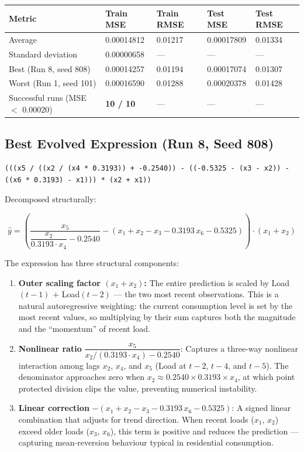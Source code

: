 \documentclass[12pt,a4paper]{article}
\begin{document}
\begin{center}
\begin{tabular}{lllll}
\toprule
\textbf{Metric} & \textbf{Train MSE} & \textbf{Train RMSE} & \textbf{Test MSE} & \textbf{Test RMSE} \\
\midrule
Average                           & 0.00014812 & 0.01217 & 0.00017809 & 0.01334 \\
Standard deviation                & 0.00000658 & ---     & ---        & ---     \\
Best (Run 8, seed 808)            & 0.00014257 & 0.01194 & 0.00017074 & 0.01307 \\
Worst (Run 1, seed 101)           & 0.00016590 & 0.01288 & 0.00020378 & 0.01428 \\
Successful runs (MSE $<$ 0.00020) & \textbf{10 / 10} & --- & --- & --- \\
\bottomrule
\end{tabular}
\end{center}

\subsection{Best Evolved Expression (Run 8, Seed 808)}

\begin{lstlisting}
(((x5 / ((x2 / (x4 * 0.3193)) + -0.2540)) - ((-0.5325 - (x3 - x2)) - ((x6 * 0.3193) - x1))) * (x2 + x1))
\end{lstlisting}

Decomposed structurally:

\[
\hat{y} = \left(\frac{x_5}{\dfrac{x_2}{0.3193 \cdot x_4} - 0.2540} - \left(x_1 + x_2 - x_3 - 0.3193\,x_6 - 0.5325\right)\right) \cdot (x_1 + x_2)
\]

The expression has three structural components:

\begin{enumerate}
    \item \textbf{Outer scaling factor $(x_1 + x_2)$:} The entire prediction is scaled by Load$(t{-}1)$ $+$ Load$(t{-}2)$ --- the two most recent observations. This is a natural autoregressive weighting: the current consumption level is set by the most recent values, so multiplying by their sum captures both the magnitude and the ``momentum'' of recent load.

    \item \textbf{Nonlinear ratio} $\dfrac{x_5}{x_2/(0.3193 \cdot x_4) - 0.2540}$: Captures a three-way nonlinear interaction among lags $x_2$, $x_4$, and $x_5$ (Load at $t{-}2$, $t{-}4$, and $t{-}5$). The denominator approaches zero when $x_2 \approx 0.2540 \times 0.3193 \times x_4$, at which point protected division clips the value, preventing numerical instability.

    \item \textbf{Linear correction} $-(x_1 + x_2 - x_3 - 0.3193\,x_6 - 0.5325)$: A signed linear combination that adjusts for trend direction. When recent loads ($x_1$, $x_2$) exceed older loads ($x_3$, $x_6$), this term is positive and reduces the prediction --- capturing mean-reversion behaviour typical in residential consumption.
\end{enumerate}
\end{document}
